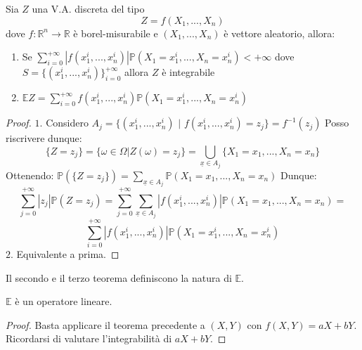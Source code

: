 \begin{theorem}
Sia $Z$ una V.A. discreta del tipo $$Z=f(X_1,...,X_n)$$ dove $f:\mathbb{R}^n\longrightarrow\mathbb{R}$ è borel-misurabile e $(X_1,...,X_n)$ è vettore aleatorio, allora:
\begin{center}
    \begin{enumerate}
        \item Se $\sum\limits_{i=0}^{+\infty}|f(x_1^i,...,x_n^i)|\mathbb{P}(X_1=x_1^i,...,X_n=x_n^i)<+\infty$ dove $S=\{(x_1^i,...,x_n^i)\}_{i=0}^{+\infty}$ allora $Z$ è integrabile
        \item $\mathbb{E}Z=\sum\limits_{i=0}^{+\infty}f(x_1^i,...,x_n^i)\mathbb{P}(X_1=x_1^i,...,X_n=x_n^i)$
    \end{enumerate}
\end{center}
\begin{proof}
$1.$ Considero $A_j=\{(x_1^i,...,x_n^i)$ $|$ $f(x_1^i,...,x_n^i)=z_j\}=f^{-1}(z_j)$
\vspace{5px}
\newline
Posso riscrivere dunque: \[\{Z=z_j\}=\{\omega\in\Omega | Z(\omega)=z_j\}=\bigcup\limits_{\underline{x}\in A_j}\{X_1=x_1,...,X_n=x_n\}\]
\vspace{5px}
\newline
Ottenendo: $\mathbb{P}(\{Z=z_j\})=\sum\limits_{\underline{x}\in A_j}\mathbb{P}(X_1=x_1,...,X_n=x_n)$
\newline
Dunque:
\[\sum\limits_{j=0}^{+\infty}|z_j|\mathbb{P}(Z=z_j)=
\sum\limits_{j=0}^{+\infty}\sum\limits_{\underline{x}\in A_j}|f(x_1^i,...,x_n^i)| \mathbb{P}(X_1=x_1,...,X_n=x_n)=\]
\[\sum\limits_{i=0}^{+\infty}|f(x_1^i,...,x_n^i)| \mathbb{P}(X_1=x_1^i,...,X_n=x_n^i)\]
\vspace{10px}
\newline
\noindent
$2.$ Equivalente a prima.
\end{proof}
\end{theorem}

\newpage
Il secondo e il terzo teorema definiscono la natura di $\mathbb{E}$.
\begin{theorem}
$\mathbb{E}$ è un operatore lineare.
\begin{proof}
Basta applicare il teorema precedente a $(X,Y)$ con $f(X,Y)=aX+bY$. Ricordarsi di valutare l'integrabilità di $aX+bY$.
\end{proof}
\end{theorem}

